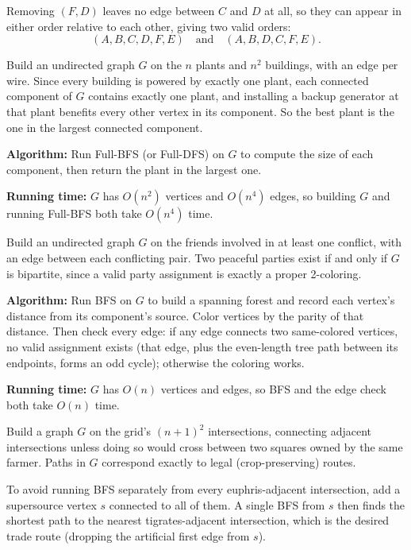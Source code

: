 \documentclass[12pt,twoside]{article}
\begin{document}
\begin{problems}
\begin{problemparts}
Removing $(F,D)$ leaves no edge between $C$ and $D$ at all, so they can appear in either order relative to each other, giving two valid orders:
\[
(A, B, C, D, F, E) \quad \text{and} \quad (A, B, D, C, F, E).
\]
\end{problemparts}

\problem  %

Build an undirected graph $G$ on the $n$ plants and $n^2$ buildings, with an edge per wire. Since every building is powered by exactly one plant, each connected component of $G$ contains exactly one plant, and installing a backup generator at that plant benefits every other vertex in its component. So the best plant is the one in the largest connected component.

\textbf{Algorithm:} Run Full-BFS (or Full-DFS) on $G$ to compute the size of each component, then return the plant in the largest one.

\textbf{Running time:} $G$ has $O(n^2)$ vertices and $O(n^4)$ edges, so building $G$ and running Full-BFS both take $O(n^4)$ time.

\problem  %

Build an undirected graph $G$ on the friends involved in at least one conflict, with an edge between each conflicting pair. Two peaceful parties exist if and only if $G$ is bipartite, since a valid party assignment is exactly a proper 2-coloring.

\textbf{Algorithm:} Run BFS on $G$ to build a spanning forest and record each vertex's distance from its component's source. Color vertices by the parity of that distance. Then check every edge: if any edge connects two same-colored vertices, no valid assignment exists (that edge, plus the even-length tree path between its endpoints, forms an odd cycle); otherwise the coloring works.

\textbf{Running time:} $G$ has $O(n)$ vertices and edges, so BFS and the edge check both take $O(n)$ time.

\problem  %

Build a graph $G$ on the grid's $(n+1)^2$ intersections, connecting adjacent intersections unless doing so would cross between two squares owned by the same farmer. Paths in $G$ correspond exactly to legal (crop-preserving) routes.

To avoid running BFS separately from every euphris-adjacent intersection, add a supersource vertex $s$ connected to all of them. A single BFS from $s$ then finds the shortest path to the nearest tigrates-adjacent intersection, which is the desired trade route (dropping the artificial first edge from $s$).


\end{problems}
\end{document}
